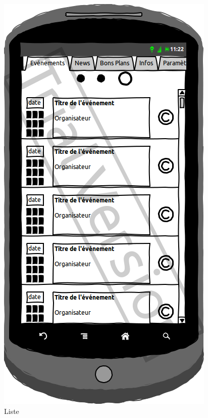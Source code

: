 \documentclass[a4paper, 11pt]{article}
\begin{document}
\begin{figure}[h!]
\begin{minipage}[c]{.50\linewidth}
\begin{center}
			\includegraphics[scale=0.29]{../../Sketch/Android/ListEvent.png}
		\end{center}
	\caption{Liste}
	\end{minipage}
\end{figure}
\vfill
\clearpage
\end{document}
